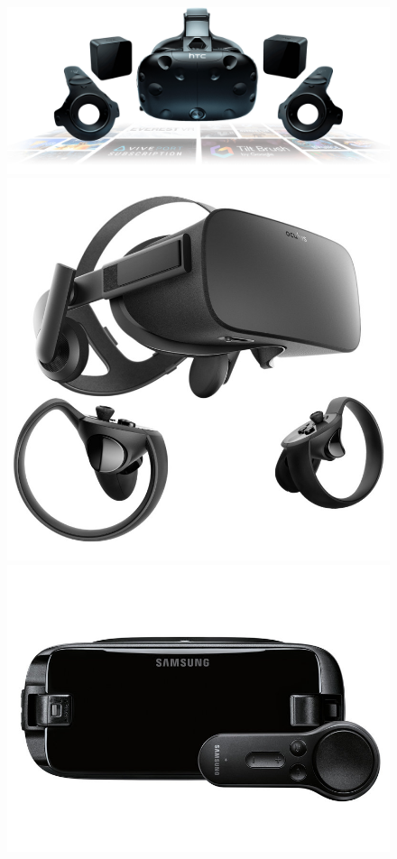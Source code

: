 \begin{figure}[!htb]
   \begin{minipage}{0.24\textwidth}
     \centering
     \includegraphics[width=0.7\linewidth, right]{images/estadodelarte/mercado/foto-htc-hive}
   \end{minipage}\hfill
   \begin {minipage}{0.24\textwidth}
     \centering
     \includegraphics[width=0.7\linewidth, left]{images/estadodelarte/mercado/foto-oculus}
   \end{minipage}
      \begin {minipage}{0.24\textwidth}
     \centering
     \includegraphics[width=0.7\linewidth, left]{images/estadodelarte/mercado/foto-samsung-vr}

\end{minipage}
\end{figure}
